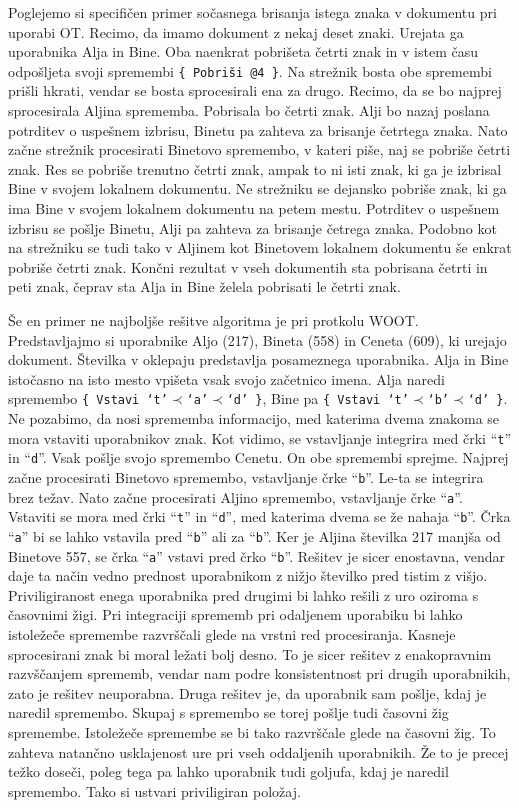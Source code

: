 \documentclass[a4paper, 12pt, twoside]{book}
\begin{document}
Poglejemo si specifičen primer sočasnega brisanja istega znaka v dokumentu pri uporabi OT. Recimo, da imamo dokument z nekaj deset znaki. Urejata ga uporabnika Alja in Bine. Oba naenkrat pobrišeta četrti znak in v istem času odpošljeta svoji spremembi {\tt \{ Pobriši @4 \}}. Na strežnik bosta obe spremembi prišli hkrati, vendar se bosta sprocesirali ena za drugo. Recimo, da se bo najprej sprocesirala Aljina sprememba. Pobrisala bo četrti znak. Alji bo nazaj poslana potrditev o uspešnem izbrisu, Binetu pa zahteva za brisanje četrtega znaka. Nato začne strežnik procesirati Binetovo spremembo, v kateri piše, naj se pobriše četrti znak. Res se pobriše trenutno četrti znak, ampak to ni isti znak, ki ga je izbrisal Bine v svojem lokalnem dokumentu. Ne strežniku se dejansko pobriše znak, ki ga ima Bine v svojem lokalnem dokumentu na petem mestu. Potrditev o uspešnem izbrisu se pošlje Binetu, Alji pa zahteva za brisanje četrega znaka. Podobno kot na strežniku se tudi tako v Aljinem kot Binetovem lokalnem dokumentu še enkrat pobriše četrti znak. Končni rezultat v vseh dokumentih sta pobrisana četrti in peti znak, čeprav sta Alja in Bine želela pobrisati le četrti znak.

Še en primer ne najboljše rešitve algoritma je pri protkolu WOOT. Predstavljajmo si uporabnike Aljo (217), Bineta (558) in Ceneta (609), ki urejajo dokument. Številka v oklepaju predstavlja posameznega uporabnika. Alja in Bine istočasno na isto mesto vpišeta vsak svojo začetnico imena. Alja naredi spremembo {\tt \{ Vstavi ‘t’$\prec$‘a’$\prec$‘d’ \}}, Bine pa {\tt \{ Vstavi ‘t’$\prec$‘b’$\prec$‘d’ \}}. Ne pozabimo, da nosi sprememba informacijo, med katerima dvema znakoma se mora vstaviti uporabnikov znak. Kot vidimo, se vstavljanje integrira med črki “{\tt t}” in “{\tt d}”.  Vsak pošlje svojo spremembo Cenetu. On obe spremembi sprejme. Najprej začne procesirati Binetovo spremembo, vstavljanje črke “{\tt b}”. Le-ta se integrira brez težav. Nato začne procesirati Aljino spremembo, vstavljanje črke “{\tt a}”. Vstaviti se mora med črki “{\tt t}” in “{\tt d}”, med katerima dvema se že nahaja “{\tt b}”. Črka “{\tt a}” bi se lahko vstavila pred “{\tt b}” ali za “{\tt b}”. Ker je Aljina številka 217 manjša od Binetove 557, se črka “{\tt a}” vstavi pred črko “{\tt b}”. Rešitev je sicer enostavna, vendar daje ta način vedno prednost uporabnikom z nižjo številko pred tistim z višjo. Priviligiranost enega uporabnika pred drugimi bi lahko rešili z uro oziroma s časovnimi žigi. Pri integraciji sprememb pri odaljenem uporabiku bi lahko istoležeče spremembe razvrščali glede na vrstni red procesiranja. Kasneje sprocesirani znak bi moral ležati bolj desno. To je sicer rešitev z enakopravnim razvščanjem sprememb, vendar nam podre konsistentnost pri drugih uporabnikih, zato je rešitev neuporabna. Druga rešitev je, da uporabnik sam pošlje, kdaj je naredil spremembo. Skupaj s spremembo se torej pošlje tudi časovni žig spremembe. Istoležeče spremembe se bi tako razvrščale glede na časovni žig. To zahteva natančno usklajenost ure pri vseh oddaljenih uporabnikih. Že to je precej težko doseči, poleg tega pa lahko uporabnik tudi goljufa, kdaj je naredil spremembo. Tako si ustvari priviligiran položaj.
\end{document}
